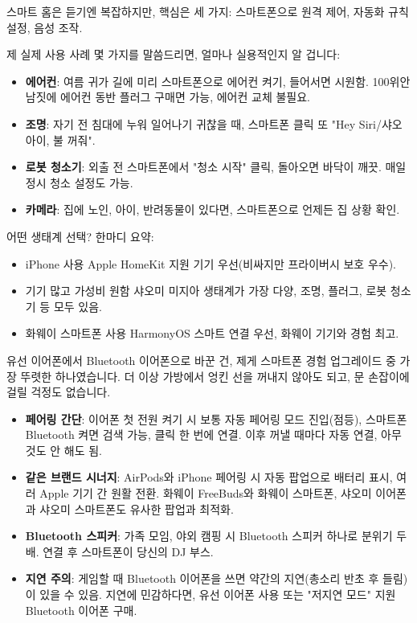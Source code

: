 
스마트 홈은 듣기엔 복잡하지만, 핵심은 세 가지: 스마트폰으로 원격 제어, 자동화 규칙 설정, 음성 조작.

제 실제 사용 사례 몇 가지를 말씀드리면, 얼마나 실용적인지 알 겁니다:

\begin{itemize}
  \item \textbf{에어컨}: 여름 귀가 길에 미리 스마트폰으로 에어컨 켜기, 들어서면 시원함. 100위안 남짓에 에어컨 동반 플러그 구매면 가능, 에어컨 교체 불필요.
  \item \textbf{조명}: 자기 전 침대에 누워 일어나기 귀찮을 때, 스마트폰 클릭 또 "Hey Siri/샤오아이, 불 꺼줘".
  \item \textbf{로봇 청소기}: 외출 전 스마트폰에서 "청소 시작" 클릭, 돌아오면 바닥이 깨끗. 매일 정시 청소 설정도 가능.
  \item \textbf{카메라}: 집에 노인, 아이, 반려동물이 있다면, 스마트폰으로 언제든 집 상황 확인.
\end{itemize}

어떤 생태계 선택? 한마디 요약:

\begin{itemize}
  \item iPhone 사용 Apple HomeKit 지원 기기 우선(비싸지만 프라이버시 보호 우수).
  \item 기기 많고 가성비 원함 샤오미 미지아 생태계가 가장 다양, 조명, 플러그, 로봇 청소기 등 모두 있음.
  \item 화웨이 스마트폰 사용 HarmonyOS 스마트 연결 우선, 화웨이 기기와 경험 최고.
\end{itemize}


유선 이어폰에서 Bluetooth 이어폰으로 바꾼 건, 제게 스마트폰 경험 업그레이드 중 가장 뚜렷한 하나였습니다. 더 이상 가방에서 엉킨 선을 꺼내지 않아도 되고, 문 손잡이에 걸릴 걱정도 없습니다.

\begin{itemize}
  \item \textbf{페어링 간단}: 이어폰 첫 전원 켜기 시 보통 자동 페어링 모드 진입(점등), 스마트폰 Bluetooth 켜면 검색 가능, 클릭 한 번에 연결. 이후 꺼낼 때마다 자동 연결, 아무것도 안 해도 됨.
  \item \textbf{같은 브랜드 시너지}: AirPods와 iPhone 페어링 시 자동 팝업으로 배터리 표시, 여러 Apple 기기 간 원활 전환. 화웨이 FreeBuds와 화웨이 스마트폰, 샤오미 이어폰과 샤오미 스마트폰도 유사한 팝업과 최적화.
  \item \textbf{Bluetooth 스피커}: 가족 모임, 야외 캠핑 시 Bluetooth 스피커 하나로 분위기 두 배. 연결 후 스마트폰이 당신의 DJ 부스.
  \item \textbf{지연 주의}: 게임할 때 Bluetooth 이어폰을 쓰면 약간의 지연(총소리 반초 후 들림)이 있을 수 있음. 지연에 민감하다면, 유선 이어폰 사용 또는 "저지연 모드" 지원 Bluetooth 이어폰 구매.
\end{itemize}

